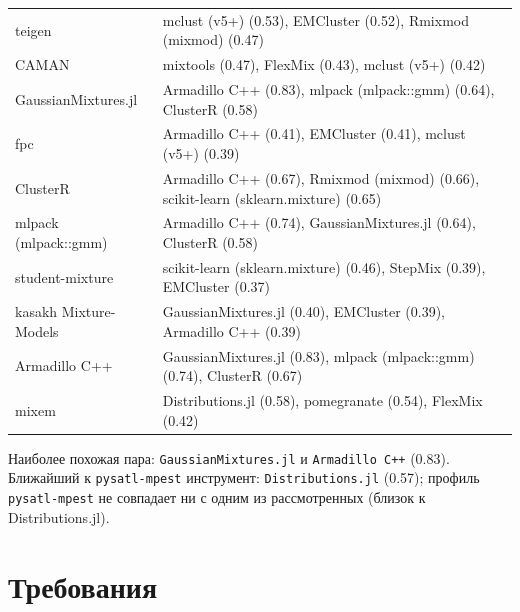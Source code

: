 \documentclass[10pt,a4paper]{article}
\begin{document}
{\begin{longtable}{@{}>{\raggedright\arraybackslash}p{3.8cm} >{\raggedright\arraybackslash}p{12.4cm}@{}}
teigen & mclust (v5+) (0.53), EMCluster (0.52), Rmixmod (mixmod) (0.47) \\
CAMAN & mixtools (0.47), FlexMix (0.43), mclust (v5+) (0.42) \\
GaussianMixtures.jl & Armadillo C++ (0.83), mlpack (mlpack::gmm) (0.64), ClusterR (0.58) \\
fpc & Armadillo C++ (0.41), EMCluster (0.41), mclust (v5+) (0.39) \\
ClusterR & Armadillo C++ (0.67), Rmixmod (mixmod) (0.66), scikit-learn (sklearn.mixture) (0.65) \\
mlpack (mlpack::gmm) & Armadillo C++ (0.74), GaussianMixtures.jl (0.64), ClusterR (0.58) \\
student-mixture & scikit-learn (sklearn.mixture) (0.46), StepMix (0.39), EMCluster (0.37) \\
kasakh Mixture-Models & GaussianMixtures.jl (0.40), EMCluster (0.39), Armadillo C++ (0.39) \\
Armadillo C++ & GaussianMixtures.jl (0.83), mlpack (mlpack::gmm) (0.74), ClusterR (0.67) \\
mixem & Distributions.jl (0.58), pomegranate (0.54), FlexMix (0.42) \\
\bottomrule
\end{longtable}}
Наиболее похожая пара: \texttt{GaussianMixtures.jl} и \texttt{Armadillo C++}
(0.83). Ближайший к \texttt{pysatl-mpest} инструмент: \texttt{Distributions.jl} (0.57);
профиль \texttt{pysatl-mpest} не совпадает ни с одним из рассмотренных (близок к Distributions.jl).

\part{Требования}
\end{document}
